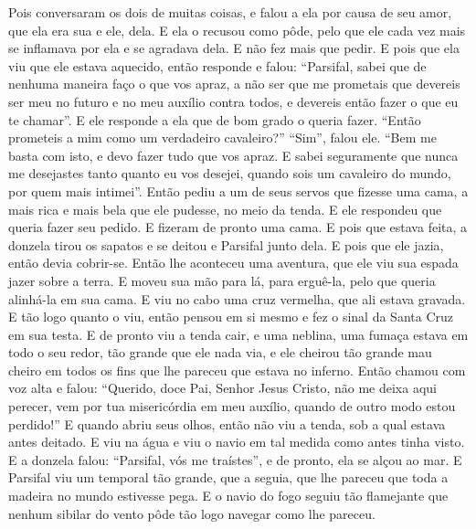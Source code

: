 Pois conversaram os dois de muitas coisas, e falou a ela por causa de seu
amor, que ela era sua e ele, dela. E ela o recusou como pôde, pelo que ele cada
vez mais se inflamava por ela e se agradava dela. E não fez mais que pedir. E
pois que ela viu que ele estava aquecido, então responde e falou: “Parsifal,
sabei que de nenhuma maneira faço o que vos apraz, a não ser que me prometais
que devereis ser meu no futuro e no meu auxílio contra todos, e devereis então
fazer o que eu te chamar”. E ele responde a ela que de bom grado o queria
fazer. “Então prometeis a mim como um verdadeiro cavaleiro?” “Sim”, falou ele.
“Bem me basta com isto, e devo fazer tudo que vos apraz. E sabei seguramente
que nunca me desejastes tanto quanto eu vos desejei, quando sois um cavaleiro
do mundo, por quem mais intimei”. Então pediu a um de seus servos que fizesse
uma cama, a mais rica e mais bela que ele pudesse, no meio da tenda. E ele
respondeu que queria fazer seu pedido. E fizeram de pronto uma cama. E pois que
estava feita, a donzela tirou os sapatos e se deitou e Parsifal junto dela. E
pois que ele jazia, então devia cobrir-se. Então lhe aconteceu uma aventura,
que ele viu sua espada jazer sobre a terra. E moveu sua mão para lá, para
erguê-la, pelo que queria alinhá-la em sua cama. E viu no cabo uma cruz
vermelha, que ali estava gravada. E tão logo quanto o viu, então pensou em si
mesmo e fez o sinal da Santa Cruz em sua testa. E de pronto viu a tenda cair, e
uma neblina, uma fumaça estava em todo o seu redor, tão grande que ele nada
via, e ele cheirou tão grande mau cheiro em todos os fins que lhe pareceu que
estava no inferno. Então chamou com voz alta e falou: “Querido, doce Pai,
Senhor Jesus Cristo, não me deixa aqui perecer, vem por tua misericórdia em meu
auxílio, quando de outro modo estou perdido!” E quando abriu seus olhos, então
não viu a tenda, sob a qual estava antes deitado. E viu na água e viu o navio
em tal medida como antes tinha visto. E a donzela falou: “Parsifal, vós me
traístes”, e de pronto, ela se alçou ao mar. E Parsifal viu um temporal tão
grande, que a seguia, que lhe pareceu que toda a madeira no mundo estivesse
pega. E o navio do fogo seguiu tão flamejante que nenhum sibilar do vento pôde
tão logo navegar como lhe pareceu. 

